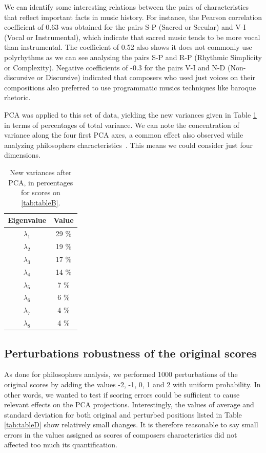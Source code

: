 \documentclass[
 aip,
 jmp,
 amsmath,amssymb,
 reprint,
]{revtex4-1}
\begin{document}
We can identify some interesting relations between the pairs of
characteristics that reflect important facts in music history. For
instance, the Pearson correlation coefficient of 0.63 was obtained for
the pairs S-P (Sacred or Secular) and V-I (Vocal or Instrumental),
which indicate that sacred music tends to be more vocal than
instrumental. The coefficient of 0.52 also shows it does not commonly use polyrhythms as we can see
analysing the pairs S-P and R-P (Rhythmic Simplicity or Complexity).
Negative coefficients of -0.3 for the pairs V-I and N-D
(Non-discursive or Discursive) indicated that composers who used
just voices on their compositions also preferred to use programmatic
musics techniques like baroque rhetoric.

PCA was applied to this set of data, yielding the new variances given
in Table \ref{tab:tableC} in terms of percentages of total variance.
We can note the concentration of variance along the four
first PCA axes, a common effect also observed while analyzing
philosophers characteristics~\cite{Fabbri}. This means we could
consider just four dimensions.

\begin{table}[ht]
\caption{\label{tab:tableC}New variances after PCA, in percentages for
  scores on \ref{tab:tableB}.}

\begin{tabular}{|c||c|}
\hline
Eigenvalue  & Value     \\ \hline

$\lambda_1$ &  29 \% \\
$\lambda_2$ &  19 \% \\
$\lambda_3$ &  17 \% \\
$\lambda_4$ &  14 \% \\
$\lambda_5$ &   7 \% \\
$\lambda_6$ &   6 \% \\
$\lambda_7$ &   4 \% \\
$\lambda_8$ &   4 \% \\
\hline

\end{tabular}
\end{table}

\subsection{Perturbations robustness of the original scores}

As done for philosophers analysis, we performed 1000 perturbations of
the original scores by adding the values -2, -1, 0, 1 and 2 with
uniform probability. In other words, we wanted to test if scoring
errors could be sufficient to cause relevant effects
on the PCA projections. Interestingly, the values of average and
standard deviation for both original and perturbed positions listed in Table
\ref{tab:tableD} show relatively small changes. It is therefore
reasonable to say small errors in the values assigned as scores of composers
characteristics did not affected too much its quantification.
\end{document}
